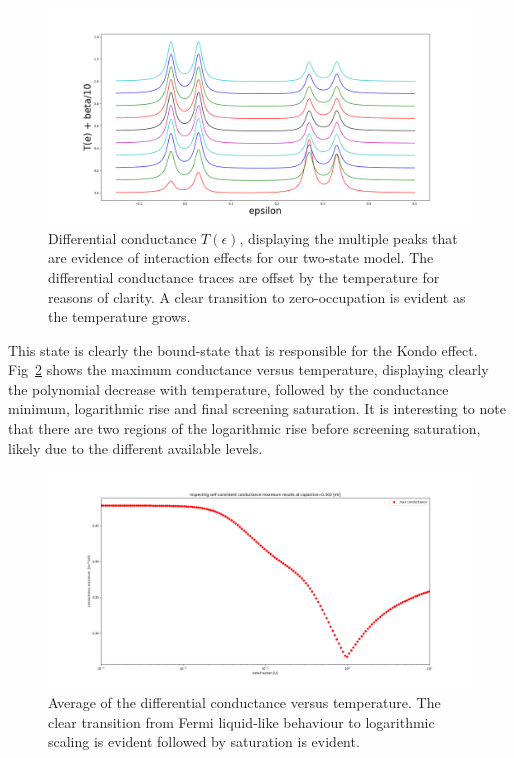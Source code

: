 \documentclass{article}
\begin{document}
\begin{multicols}{2}
        \begin{figure}[b]
            \centering
            \includegraphics[width=\textwidth]{fig/figure_3.png}
            \caption{\label{fig:transplot} Differential conductance $T(\epsilon)$, displaying the multiple peaks that are evidence of interaction effects for our two-state model. The differential conductance traces are offset by the temperature for reasons of clarity. A clear transition to zero-occupation is evident as the temperature grows.}
        \end{figure}
        
        This state is clearly the bound-state that is responsible for the Kondo effect. Fig~\ref{fig:conductance} shows the maximum conductance versus temperature, displaying clearly the polynomial decrease with temperature, followed by the conductance minimum, logarithmic rise and final screening saturation. It is interesting to note that there are two regions of the logarithmic rise before screening saturation, likely due to the different available levels.
        
        \begin{figure}[b]
            \centering
            \includegraphics[width=\textwidth]{fig/figure_5.png}
            \caption{\label{fig:conductance} Average of the differential conductance versus temperature. The clear transition from Fermi liquid-like behaviour to logarithmic scaling is evident followed by saturation is evident.}
        \end{figure}
        

\end{multicols}
\end{document}
